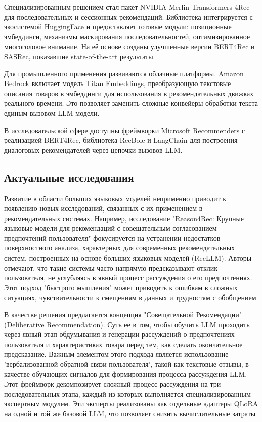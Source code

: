 Специализированным решением стал пакет NVIDIA Merlin Transformers 4Rec для последовательных и сессионных рекомендаций. Библиотека интегрируется с экосистемой HuggingFace и предоставляет готовые модули: позиционные эмбеддинги, механизмы маскирования последовательностей, оптимизированное многоголовое внимание. На её основе созданы улучшенные версии BERT4Rec и SASRec, показавшие state-of-the-art результаты.

Для промышленного применения развиваются облачные платформы. Amazon Bedrock включает модель Titan Embeddings, преобразующую текстовые описания товаров в эмбеддинги для использования в рекомендательных движках реального времени. Это позволяет заменить сложные конвейеры обработки текста единым вызовом LLM-модели.

В исследовательской сфере доступны фреймворки Microsoft Recommenders с реализацией BERT4Rec, библиотека RecBole и LangChain для построения диалоговых рекомендателей через цепочки вызовов LLM. 

\subsection*{Актуальные исследования}
Развитие в области больших языковых моделей неприменно приводит к появлению новых исследований, связанных с их применением в рекомендательных системах. 
Например, исследование "Reason4Rec: Крупные языковые модели для рекомендаций с совещательным согласованием предпочтений пользователя" фокусируется на устранении недостатков поверхностного анализа, характерных для современных рекомендательных систем, построенных на основе больших языковых моделей (RecLLM).
Авторы отмечают, что такие системы часто напрямую предсказывают отклик пользователя, не углубляясь в явный процесс рассуждения о его предпочтениях. Этот подход "быстрого мышления" может приводить к ошибкам в сложных ситуациях, чувствительности к смещениям в данных и трудностям с обобщением \citep{fang2025reason4rec}

В качестве решения предлагается концепция "Совещательной Рекомендации" (Deliberative Recommendation). Суть ее в том, чтобы обучить LLM проходить через явный этап обдумывания и генерации рассуждений о предпочтениях пользователя и характеристиках товара перед тем, как сделать окончательное предсказание. Важным элементом этого подхода является использование 'вербализованной обратной связи пользователя', такой как текстовые отзывы, в качестве обучающих сигналов для формирования процесса рассуждения LLM. Этот фреймворк декомпозирует сложный процесс рассуждения на три последовательных этапа, каждый из которых выполняется специализированным экспертным модулем. Эти эксперты реализованы как отдельные адаптеры QLoRA на одной и той же базовой LLM, что позволяет снизить вычислительные затраты

